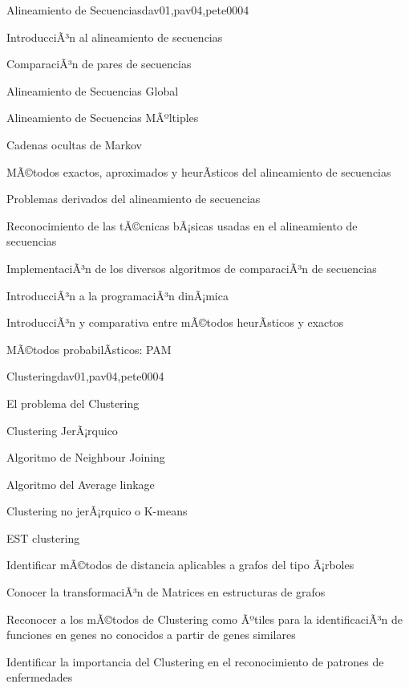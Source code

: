 \begin{syllabus}
\begin{unit}{Alineamiento de Secuencias}{dav01,pav04,pete00}{0}{4}
\begin{topics}
        \item IntroducciÃ³n al alineamiento de secuencias
        \item ComparaciÃ³n de pares de secuencias
        \item Alineamiento de Secuencias Global
        \item Alineamiento de Secuencias MÃºltiples
        \item Cadenas ocultas de Markov
        \item MÃ©todos exactos, aproximados y heurÃ­sticos del alineamiento de secuencias
        \item Problemas derivados del alineamiento de secuencias
    \end{topics}
    \begin{learningoutcomes}
        \item Reconocimiento de las tÃ©cnicas bÃ¡sicas usadas en el alineamiento de secuencias
        \item ImplementaciÃ³n de los diversos algoritmos de comparaciÃ³n de secuencias
        \item IntroducciÃ³n a la programaciÃ³n dinÃ¡mica
        \item IntroducciÃ³n y comparativa entre mÃ©todos heurÃ­sticos y exactos
        \item MÃ©todos probabilÃ­sticos: PAM
    \end{learningoutcomes}
\end{unit}

\begin{unit}{Clustering}{dav01,pav04,pete00}{0}{4}
\begin{topics}
        \item El problema del Clustering
        \item Clustering JerÃ¡rquico
        \item Algoritmo de Neighbour Joining
        \item Algoritmo del Average linkage
        \item Clustering no jerÃ¡rquico o K-means
        \item EST clustering
    \end{topics}
    \begin{learningoutcomes}
        \item Identificar mÃ©todos de distancia aplicables a grafos del tipo Ã¡rboles
        \item Conocer la transformaciÃ³n de Matrices en estructuras de grafos
        \item Reconocer a los mÃ©todos de Clustering como Ãºtiles para la identificaciÃ³n de funciones en genes no conocidos a partir de genes similares
        \item Identificar la importancia del Clustering en el reconocimiento de patrones de enfermedades
    \end{learningoutcomes}
\end{unit}


\end{syllabus}
